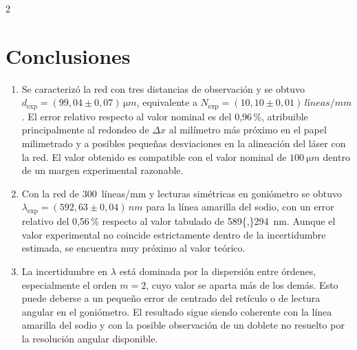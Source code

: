 \documentclass[12pt,a4paper]{article}
\begin{document}
\begin{multicols}{2}
\section{Conclusiones}

\begin{enumerate}
    \item Se caracterizó la red con tres distancias de observación y se obtuvo
\(d_{\mathrm{exp}}=(99{,}04\pm0{,}07)\,\si{\micro m}\),
    equivalente a
\(N_{\mathrm{exp}}=(10{,}10\pm0{,}01)\,\si{líneas/mm}\).
    El error relativo respecto al valor nominal es del 0{,}96\,\%, atribuible
    principalmente al redondeo de $\Delta x$ al milímetro más próximo en el
    papel milimetrado y a posibles pequeñas desviaciones en la alineación del
    láser con la red. El valor obtenido es compatible con el valor nominal de
    \(\SI{100}{\micro m}\) dentro de un margen experimental razonable.

    \item Con la red de \SI{300}{líneas/mm} y lecturas simétricas en goniómetro
    se obtuvo
\(\lambda_{\mathrm{exp}}=(592{,}63\pm0{,}04)\,\si{nm}\)
    para la línea amarilla del sodio, con un error relativo del 0{,}56\,\%
    respecto al valor tabulado de \SI{589{,}294}{nm}. Aunque el valor experimental
    no coincide estrictamente dentro de la incertidumbre estimada, se encuentra
    muy próximo al valor teórico.

    \item La incertidumbre en $\lambda$ está dominada por la dispersión entre
    órdenes, especialmente el orden $m=2$, cuyo valor se aparta más de los demás.
    Esto puede deberse a un pequeño error de centrado del retículo o de lectura
    angular en el goniómetro. El resultado sigue siendo coherente con la línea
    amarilla del sodio y con la posible observación de un doblete no resuelto por
    la resolución angular disponible.
\end{enumerate}

\end{multicols}
\end{document}
